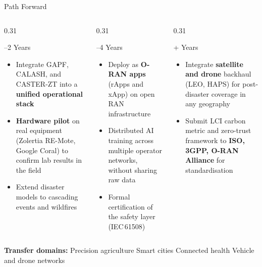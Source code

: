 \documentclass[aspectratio=169,t,10pt]{beamer}
\begin{document}
\begin{frame}[shrink=5]{Path Forward}
\begin{columns}[T]
\begin{column}{0.31\textwidth}
  \begin{block}{\faCalendar{}--2 Years}
    \begin{itemize}\small\setlength{\itemsep}{3pt}
      \item Integrate GAPF, CALASH, and CASTER-ZT
            into a \textbf{unified operational stack}
      \item \textbf{Hardware pilot} on real equipment
            (Zolertia RE-Mote, Google Coral)
            to confirm lab results in the field
      \item Extend disaster models to cascading
            events and wildfires
    \end{itemize}
  \end{block}
\end{column}
\begin{column}{0.31\textwidth}
  \begin{block}{\faCalendar{}--4 Years}
    \begin{itemize}\small\setlength{\itemsep}{3pt}
      \item Deploy as \textbf{O-RAN apps} (rApps and xApp)
            on open RAN infrastructure
      \item Distributed AI training across multiple
            operator networks, without sharing raw data
      \item Formal certification of the safety layer
            (IEC\,61508)
    \end{itemize}
  \end{block}
\end{column}
\begin{column}{0.31\textwidth}
  \begin{block}{\faCalendar{}+ Years}
    \begin{itemize}\small\setlength{\itemsep}{3pt}
      \item Integrate \textbf{satellite and drone} backhaul
            (LEO, HAPS) for post-disaster coverage
            in any geography
      \item Submit LCI carbon metric and zero-trust
            framework to \textbf{ISO, 3GPP, O-RAN Alliance}
            for standardisation
    \end{itemize}
  \end{block}
\end{column}
\end{columns}
\vspace{5pt}
{\centering\small\textbf{Transfer domains:}
  Precision agriculture \quad Smart cities \quad
  Connected health \quad Vehicle and drone networks\par}
\end{frame}
\end{document}
